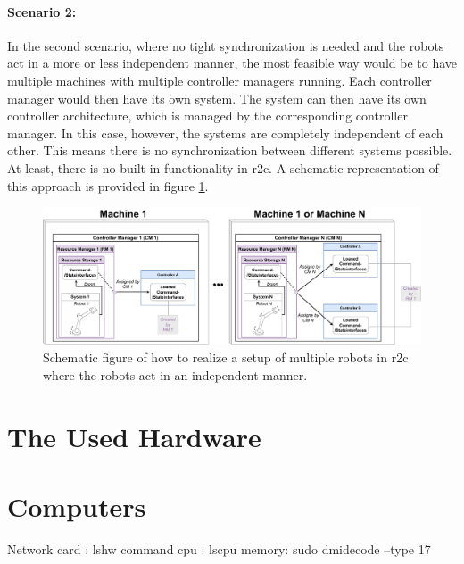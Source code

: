 \paragraph{Scenario 2:} 
In the second scenario, where no tight synchronization is needed and the robots act in a more or less independent manner, the most feasible way would be to have multiple machines with multiple controller managers running. Each controller manager would then have its own system. The system can then have its own controller architecture, which is managed by the corresponding controller manager. \newline
In this case, however, the systems are completely independent of each other. This means there is no synchronization between different systems possible. At least, there is no built-in functionality in \gls{r2c}. A schematic representation of this approach is provided in figure \ref{c3_fig_r2c_mr_is}.
\begin{figure}[htbp]
	\centering
	\includegraphics[width=1\textwidth]{Figures/c3/multiple_independent_robots_current.pdf}
	\caption{Schematic figure of how to realize a setup of multiple robots in \gls{r2c} where the robots act in an independent manner.}
	\label{c3_fig_r2c_mr_is}
\end{figure}






\section{The Used Hardware}
\section{Computers}
Network card : lshw command
cpu : lscpu
memory: sudo dmidecode --type 17

